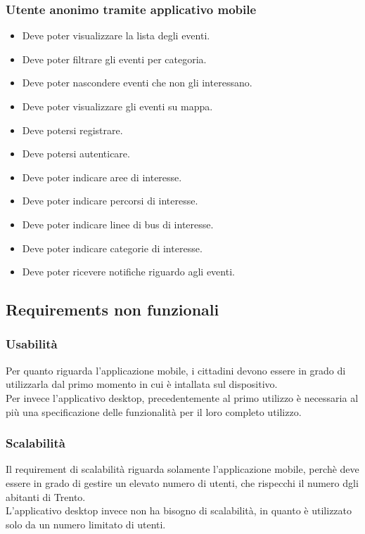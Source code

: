 \documentclass{article}
\begin{document}
\subsubsection{Utente anonimo tramite applicativo mobile}
\begin{itemize}
    \item Deve poter visualizzare la lista degli eventi.
    \item Deve poter filtrare gli eventi per categoria.
    \item Deve poter nascondere eventi che non gli interessano.
    \item Deve poter visualizzare gli eventi su mappa.
    \item Deve potersi registrare.
    \item Deve potersi autenticare.
    \item Deve poter indicare aree di interesse.
    \item Deve poter indicare percorsi di interesse.
    \item Deve poter indicare linee di bus di interesse.
    \item Deve poter indicare categorie di interesse.
    \item Deve poter ricevere notifiche riguardo agli eventi.
\end{itemize}

\clearpage

\subsection{Requirements non funzionali}

\subsubsection{Usabilità}
Per quanto riguarda l'applicazione mobile, i cittadini devono essere in grado di utilizzarla dal primo momento in cui è intallata sul dispositivo.\\
Per invece l'applicativo desktop, precedentemente al primo utilizzo è necessaria al più una specificazione delle funzionalità per il loro completo utilizzo.\\

\subsubsection{Scalabilità}
Il requirement di scalabilità riguarda solamente l'applicazione mobile, perchè deve essere in grado di gestire un elevato numero di utenti, che rispecchi il numero dgli abitanti di Trento.\\
L'applicativo desktop invece non ha bisogno di scalabilità, in quanto è utilizzato solo da un numero limitato di utenti.
\end{document}
